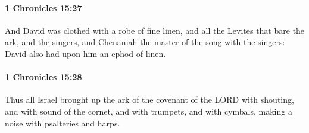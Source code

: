 		\paragraph{1 Chronicles 15:27} %
			\label{1CHRONICLES-15-27}

			And David was clothed with a robe of fine linen, and all the Levites that bare the ark, and the singers, and Chenaniah the master of the song with the singers: David also had upon him an ephod of linen.


		\paragraph{1 Chronicles 15:28} %
			\label{1CHRONICLES-15-28}

			Thus all Israel brought up the ark of the covenant of the LORD with shouting, and with sound of the cornet, and with trumpets, and with cymbals, making a noise with psalteries and harps.

